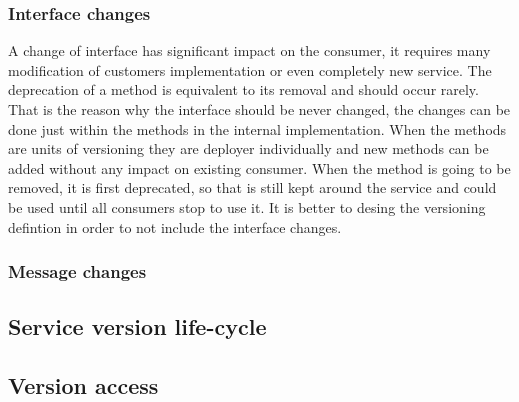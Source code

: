 \subsubsection{Interface changes}
A change of interface has significant impact on the consumer, it requires many modification of customers implementation or even completely new service. The deprecation of a method is equivalent to its removal and should occur rarely.
That is the reason why the interface should be never changed, the changes can be done just within the methods in the internal implementation. When the methods are units of versioning they are deployer individually and new methods can be added without any impact on existing consumer. When the method is going to be removed, it is first deprecated, so that is still kept around the service and could be used until all consumers stop to use it.
It is better to desing the versioning defintion in order to not include the interface changes.

\subsubsection{Message changes}



\subsection{Service version life-cycle}
\subsection{Version access}







